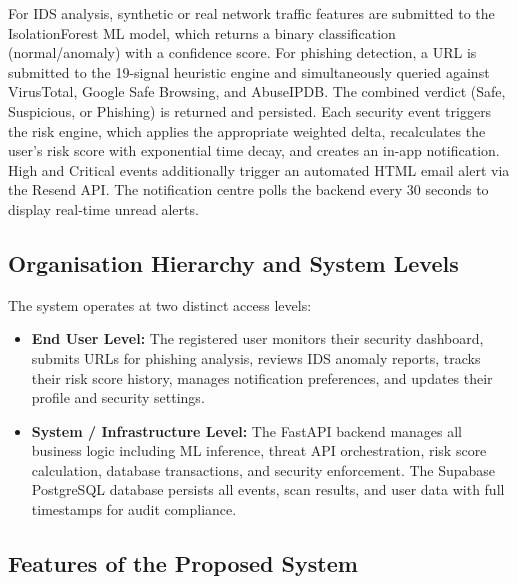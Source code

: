 For IDS analysis, synthetic or real network traffic features are submitted to the IsolationForest ML model, which returns a binary classification (normal/anomaly) with a confidence score. For phishing detection, a URL is submitted to the 19-signal heuristic engine and simultaneously queried against VirusTotal, Google Safe Browsing, and AbuseIPDB. The combined verdict (Safe, Suspicious, or Phishing) is returned and persisted. Each security event triggers the risk engine, which applies the appropriate weighted delta, recalculates the user's risk score with exponential time decay, and creates an in-app notification. High and Critical events additionally trigger an automated HTML email alert via the Resend API. The notification centre polls the backend every 30 seconds to display real-time unread alerts.

\subsection*{Organisation Hierarchy and System Levels}

The system operates at two distinct access levels:

\begin{itemize}
    \item \textbf{End User Level:} The registered user monitors their security dashboard, submits URLs for phishing analysis, reviews IDS anomaly reports, tracks their risk score history, manages notification preferences, and updates their profile and security settings.
    \item \textbf{System / Infrastructure Level:} The FastAPI backend manages all business logic including ML inference, threat API orchestration, risk score calculation, database transactions, and security enforcement. The Supabase PostgreSQL database persists all events, scan results, and user data with full timestamps for audit compliance.
\end{itemize}

\subsection*{Features of the Proposed System}

